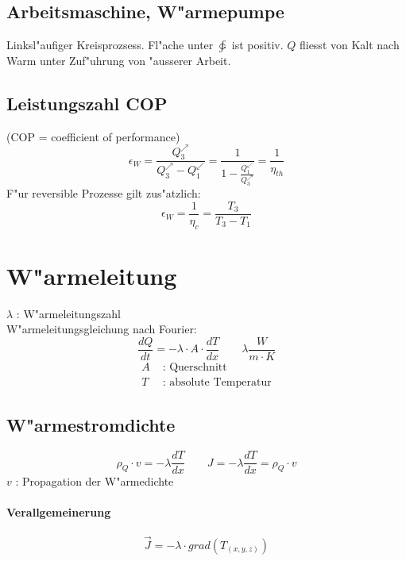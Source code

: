 \subsection{Arbeitsmaschine, W"armepumpe}
Linksl"aufiger Kreisprozsess. Fl"ache unter $\ointctrclockwise$ ist positiv. $Q$ fliesst von Kalt nach Warm unter Zuf"uhrung von "ausserer Arbeit.

\subsection{Leistungszahl COP}
(COP = coefficient of performance)
\begin{equation}
	\epsilon_W=\frac{Q_3^\nearrow}{Q_3^\nearrow-Q_1^\swarrow}=\frac{1}{1-\frac{Q_1^\swarrow}{Q_3^\nearrow}}=\frac{1}{\eta_{th}}
\end{equation}
\noindent F"ur reversible Prozesse gilt zus"atzlich:
\begin{equation}
	\epsilon_W=\frac{1}{\eta_c}=\frac{T_3}{T_3-T_1}
\end{equation}

\section{W"armeleitung}
$\lambda$ : W"armeleitungszahl \\
\noindent W"armeleitungsgleichung nach Fourier:
\begin{equation}
	\frac{dQ}{dt}=-\lambda\cdot A\cdot\frac{dT}{dx}\qquad\lambda\unit{\frac{W}{m\cdot K}}
\end{equation}
\begin{align*}
	A &\text{ : Querschnitt} \\
	T &\text{ : absolute Temperatur}
\end{align*}

\subsection{W"armestromdichte}
\begin{equation}
	\rho_Q\cdot v=-\lambda\frac{dT}{dx}\qquad J=-\lambda\frac{dT}{dx}=\rho_Q\cdot v
\end{equation}
\noindent $v$ : Propagation der W"armedichte \\

\paragraph{Verallgemeinerung}
\begin{equation}
	\overrightarrow{J}=-\lambda\cdot grad\left({T_{(x,y,z)}}\right)
\end{equation}

